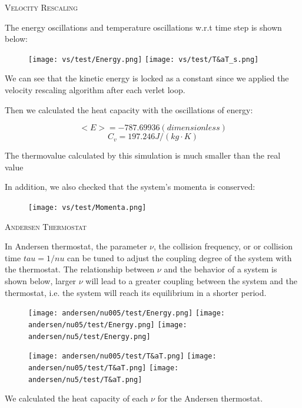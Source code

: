\documentclass{article}
\begin{document}
\begin{spacing}{1}
\vspace{1.5em}
\textsc{\Large Velocity Rescaling}

The energy oscillations and temperature oscillations w.r.t time step is shown below:

\begin{figure}[htbp]
  \centering
  \texttt{[image: vs/test/Energy.png]}
  \texttt{[image: vs/test/T\&aT\_s.png]}
\end{figure}

We can see that the kinetic energy is locked as a constant since we applied the velocity rescaling algorithm after each verlet loop.

Then we calculated the heat capacity with the oscillations of energy:

$$<E> = -787.69936 (dimensionless)$$
$$C_v = 197.246J/(kg\cdot K)$$

The thermovalue calculated by this simulation is much smaller than the real value

In addition, we also checked that the system's momenta is conserved:

\begin{figure}[htbp]
  \centering
  \texttt{[image: vs/test/Momenta.png]}
\end{figure}


\vspace{1.5em}
\textsc{\Large Andersen Thermostat}

In Andersen thermostat, the parameter $\nu$, the collision frequency, or or collision time $tau=1/nu$ can be tuned to adjust the coupling degree of the system with the thermostat. The relationship between $\nu$ and the behavior of a system is shown below, larger $\nu$ will lead to a greater coupling between the system and the thermostat, i.e. the system will reach its equilibrium in a shorter period.

\begin{figure}[htbp]
  \centering
  \texttt{[image: andersen/nu005/test/Energy.png]}
  \texttt{[image: andersen/nu05/test/Energy.png]}
  \texttt{[image: andersen/nu5/test/Energy.png]}
\end{figure}

\begin{figure}[htbp]
  \centering
  \texttt{[image: andersen/nu005/test/T\&aT.png]}
  \texttt{[image: andersen/nu05/test/T\&aT.png]}
  \texttt{[image: andersen/nu5/test/T\&aT.png]}
\end{figure}

We calculated the heat capacity of each $\nu$ for the Andersen thermostat.



\end{spacing}
\end{document}
